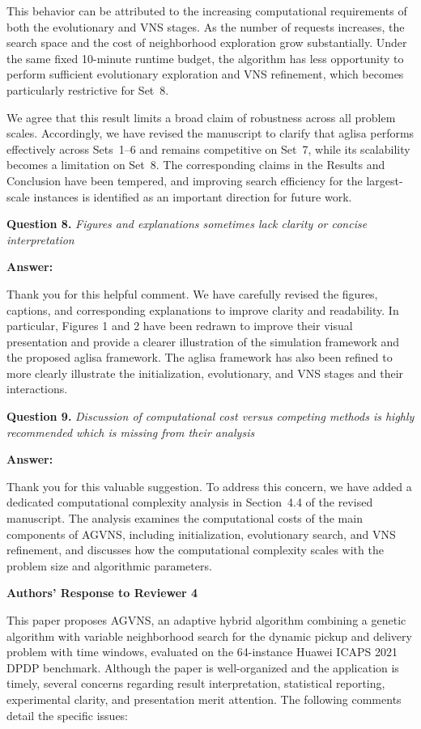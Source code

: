 \documentclass[11pt]{article}
\newcommand{\question}[2]{\vspace{0.5em}\noindent\textbf{Question #1.} \emph{#2}\par}
\newcommand{\answer}{\noindent\textbf{Answer:}\par}
\begin{document}
This behavior can be attributed to the increasing computational requirements of both the evolutionary and VNS stages. As the number of requests increases, the search space and the cost of neighborhood exploration grow substantially. Under the same fixed 10-minute runtime budget, the algorithm has less opportunity to perform sufficient evolutionary exploration and VNS refinement, which becomes particularly restrictive for Set~8.

We agree that this result limits a broad claim of robustness across all problem scales. Accordingly, we have revised the manuscript to clarify that \gls{aglisa} performs effectively across Sets~1--6 and remains competitive on Set~7, while its scalability becomes a limitation on Set~8. The corresponding claims in the Results and Conclusion have been tempered, and improving search efficiency for the largest-scale instances is identified as an important direction for future work.

\question{8}{Figures and explanations sometimes lack clarity or concise interpretation}
\answer
Thank you for this helpful comment. We have carefully revised the figures, captions, and corresponding explanations to improve clarity and readability. In particular, Figures 1 and 2 have been redrawn to improve their visual presentation and provide a clearer illustration of the simulation framework and the proposed \gls{aglisa} framework. The \gls{aglisa}  framework has also been refined to more clearly illustrate the initialization, evolutionary, and VNS stages and their interactions.

\question{9}{Discussion of computational cost versus competing methods is highly recommended which is missing from their analysis}
\answer
Thank you for this valuable suggestion. To address this concern, we have added a dedicated computational complexity analysis in Section~4.4 of the revised manuscript. The analysis examines the computational costs of the main components of AGVNS, including initialization, evolutionary search, and VNS refinement, and discusses how the computational complexity scales with the problem size and algorithmic parameters.
\newpage
\begin{center}
\textbf{\Large Authors' Response to Reviewer 4}
\end{center}

This paper proposes AGVNS, an adaptive hybrid algorithm combining a genetic algorithm with variable neighborhood search for the dynamic pickup and delivery problem with time windows, evaluated on the 64-instance Huawei ICAPS 2021 DPDP benchmark. Although the paper is well-organized and the application is timely, several concerns regarding result interpretation, statistical reporting, experimental clarity, and presentation merit attention. The following comments detail the specific issues:
\end{document}
